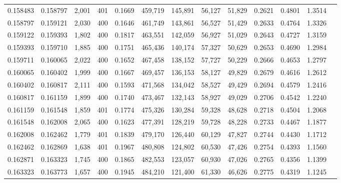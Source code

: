 \begin{tabular}{rrrrrrrrrrrrr}
0.158483 & 0.158797 & 2,001 & 401 &                                     0.1669 & 459,719 & 145,891 &  56,127 &  51,829 & 0.2621 & 0.4801 & 1.3514 \\
0.158797 & 0.159121 & 2,030 & 400 &                                     0.1646 & 461,749 & 143,861 &  56,527 &  51,429 & 0.2633 & 0.4764 & 1.3326 \\
0.159122 & 0.159393 & 1,802 & 400 &                                     0.1817 & 463,551 & 142,059 &  56,927 &  51,029 & 0.2643 & 0.4727 & 1.3159 \\
0.159393 & 0.159710 & 1,885 & 400 &                                     0.1751 & 465,436 & 140,174 &  57,327 &  50,629 & 0.2653 & 0.4690 & 1.2984 \\
0.159711 & 0.160065 & 2,022 & 400 &                                     0.1652 & 467,458 & 138,152 &  57,727 &  50,229 & 0.2666 & 0.4653 & 1.2797 \\
0.160065 & 0.160402 & 1,999 & 400 &                                     0.1667 & 469,457 & 136,153 &  58,127 &  49,829 & 0.2679 & 0.4616 & 1.2612 \\
0.160402 & 0.160817 & 2,111 & 400 &                                     0.1593 & 471,568 & 134,042 &  58,527 &  49,429 & 0.2694 & 0.4579 & 1.2416 \\
0.160817 & 0.161159 & 1,899 & 400 &                                     0.1740 & 473,467 & 132,143 &  58,927 &  49,029 & 0.2706 & 0.4542 & 1.2240 \\
0.161159 & 0.161548 & 1,859 & 401 &                                     0.1774 & 475,326 & 130,284 &  59,328 &  48,628 & 0.2718 & 0.4504 & 1.2068 \\
0.161548 & 0.162008 & 2,065 & 400 &                                     0.1623 & 477,391 & 128,219 &  59,728 &  48,228 & 0.2733 & 0.4467 & 1.1877 \\
0.162008 & 0.162462 & 1,779 & 401 &                                     0.1839 & 479,170 & 126,440 &  60,129 &  47,827 & 0.2744 & 0.4430 & 1.1712 \\
0.162462 & 0.162869 & 1,638 & 401 &                                     0.1967 & 480,808 & 124,802 &  60,530 &  47,426 & 0.2754 & 0.4393 & 1.1560 \\
0.162871 & 0.163323 & 1,745 & 400 &                                     0.1865 & 482,553 & 123,057 &  60,930 &  47,026 & 0.2765 & 0.4356 & 1.1399 \\
0.163323 & 0.163773 & 1,657 & 400 &                                     0.1945 & 484,210 & 121,400 &  61,330 &  46,626 & 0.2775 & 0.4319 & 1.1245 \\

\end{tabular}
